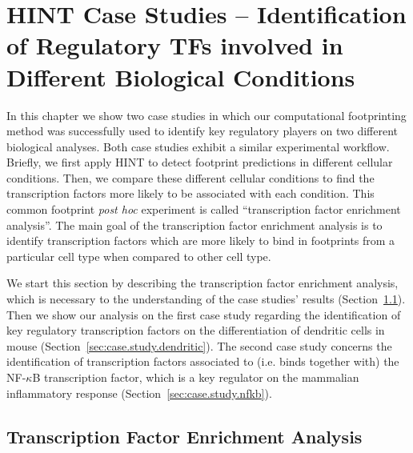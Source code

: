 \section{HINT Case Studies -- Identification of Regulatory TFs involved in Different Biological Conditions}
\label{sec:case.studies}

In this chapter we show two case studies in which our computational footprinting method was successfully used to identify key regulatory players on two different biological analyses. Both case studies exhibit a similar experimental workflow. Briefly, we first apply HINT to detect footprint predictions in different cellular conditions. Then, we compare these different cellular conditions to find the transcription factors more likely to be associated with each condition. This common footprint \emph{post hoc} experiment is called ``transcription factor enrichment analysis''. The main goal of the transcription factor enrichment analysis is to identify transcription factors which are more likely to bind in footprints from a particular cell type when compared to other cell type.

We start this section by describing the transcription factor enrichment analysis, which is necessary to the understanding of the case studies' results (Section~\ref{sec:transcription.factor.enrichment.analysis}). Then we show our analysis on the first case study regarding the identification of key regulatory transcription factors on the differentiation of dendritic cells in mouse (Section~\ref{sec:case.study.dendritic}). The second case study concerns the identification of transcription factors associated to (i.e. binds together with) the NF-$\kappa$B transcription factor, which is a key regulator on the mammalian inflammatory response (Section~\ref{sec:case.study.nfkb}).

\subsection{Transcription Factor Enrichment Analysis}
\label{sec:transcription.factor.enrichment.analysis}

